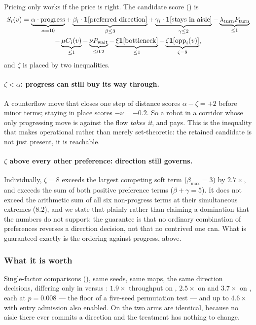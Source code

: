 Pricing only works if the price is right. The candidate score
() is
\begin{multline}
  S_i(v) = \underbrace{\alpha \cdot \mathrm{progress}}_{\alpha = 10}
    + \underbrace{\beta_i \cdot \mathbf{1}\!\left[\text{preferred direction}\right]}_{\beta \leq 3}
    + \underbrace{\gamma_i \cdot \mathbf{1}\!\left[\text{stays in aisle}\right]}_{\gamma \leq 2}
    - \underbrace{\lambda_{\mathrm{turn}} P_{\mathrm{turn}}}_{\leq 1}\\
    - \underbrace{\mu C_i(v)}_{\leq 1}
    - \underbrace{\nu P_{\mathrm{wait}}}_{\leq 0.2}
    - \underbrace{\xi \mathbf{1}\!\left[\text{bottleneck}\right]}_{\leq 1}
    - \underbrace{\zeta \mathbf{1}\!\left[\mathrm{opp}_i(v)\right]}_{\zeta = 8},
\end{multline}
and $\zeta$ is placed by two inequalities.

\paragraph{$\zeta < \alpha$: progress can still buy its way through.}
A counterflow move that closes one step of distance scores
$\alpha - \zeta = +2$ before minor terms; staying in place scores
$-\nu = -0.2$. So a robot in a corridor whose only progressing move is against
the flow \emph{takes it}, and pays. This is the inequality that makes
 operational rather than merely set-theoretic: the
retained candidate is not just present, it is reachable.

\paragraph{$\zeta$ above every other preference: direction still governs.}
Individually, $\zeta = 8$ exceeds the largest competing soft term
($\beta_{\max} = 3$) by $2.7\times$, and exceeds the sum of both positive
preference terms ($\beta + \gamma = 5$). It does not exceed the arithmetic sum
of all six non-progress terms at their simultaneous extremes ($8.2$), and we
state that plainly rather than claiming a domination that the numbers do not
support: the guarantee is that no ordinary combination of preferences reverses
a direction decision, not that no contrived one can. What is guaranteed
exactly is the ordering against progress, above.

\subsubsection{What it is worth}

Single-factor comparisons (), same seeds, same
maps, the same direction decisions, differing only in  versus
: $1.9\times$ throughput on ,
$2.5\times$ on  and $3.7\times$ on
, each at $p = 0.008$ --- the floor of a five-seed
permutation test --- and up to $4.6\times$ with entry admission also enabled.
On  the two arms are identical, because no aisle
there ever commits a direction and the treatment has nothing to change.


